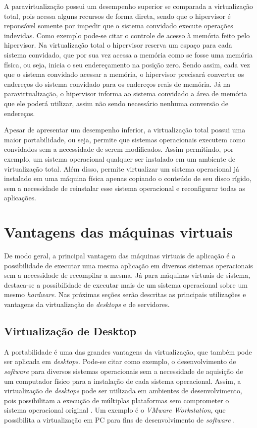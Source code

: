 A paravirtualização possui um desempenho superior se comparada a virtualização total, pois acessa alguns recursos de forma direta, sendo que 
o hipervisor é reponsável somente por impedir que o sistema convidado execute operações indevidas. Como exemplo pode-se citar o controle de
acesso à memória feito pelo hipervisor. Na virtualização total o hipervisor reserva um espaço para cada sistema convidado, que por sua vez 
acessa a memória como se fosse uma memória física, ou seja, inicia o seu endereçamento na posição zero. Sendo assim, cada vez que o sistema 
convidado acessar a memória, o hipervisor precisará converter os endereços do sistema convidado para os endereços reais de memória. Já na 
paravirtualização, o hipervisor informa ao sistema convidado a área de memória que ele poderá utilizar, assim não sendo necessário nenhuma 
conversão de endereços.

Apesar de apresentar um desempenho inferior, a virtualização total possui uma maior portabilidade, ou seja, permite que sistemas operacionais 
executem como convidados sem a necessidade de serem modificados. Assim permitindo, por exemplo, um sistema operacional qualquer ser instalado 
em um ambiente de virtualização total. Além disso, permite virtualizar um sistema operacional já instalado em uma máquina física apenas copiando 
o conteúdo de seu disco rígido, sem a necessidade de reinstalar esse sistema operacional e reconfigurar todas as aplicações.

\section{Vantagens das máquinas virtuais}
\label{section:virtvantag}

De modo geral, a principal vantagem das máquinas virtuais de aplicação é a possibilidade de executar uma mesma aplicação em diversos sistemas 
operacionais sem a necessidade de recompilar a mesma. Já para máquinas virtuais de sistema, destaca-se a possibilidade de executar mais de um 
sistema operacional sobre um mesmo \textit{hardware}. Nas próximas seções serão descritas as principais utilizações e vantagens da virtualização 
de \textit{desktops} e de servidores.

\subsection{Virtualização de Desktop}
\label{section:virtdesk}

A portabilidade é uma das grandes vantagens da virtualização, que também pode ser aplicada em \textit{desktops}. Pode-se citar como exemplo, 
o desenvolvimento de \textit{software} para diversos sistemas operacionais sem a necessidade de aquisição de um computador físico para a instalação
de cada sistema operacional. Assim, a virtualização de \textit{desktops} pode ser utilizada em ambientes de desenvolvimento, pois possibilitam 
a execução de múltiplas plataformas sem comprometer o sistema operacional original \cite{carissimi2008}. Um exemplo é o 
\textit{VMware Workstation}, que possibilita a virtualização em \ac{PC} para fins de desenvolvimento de \textit{software} \cite{vmware2016}.

